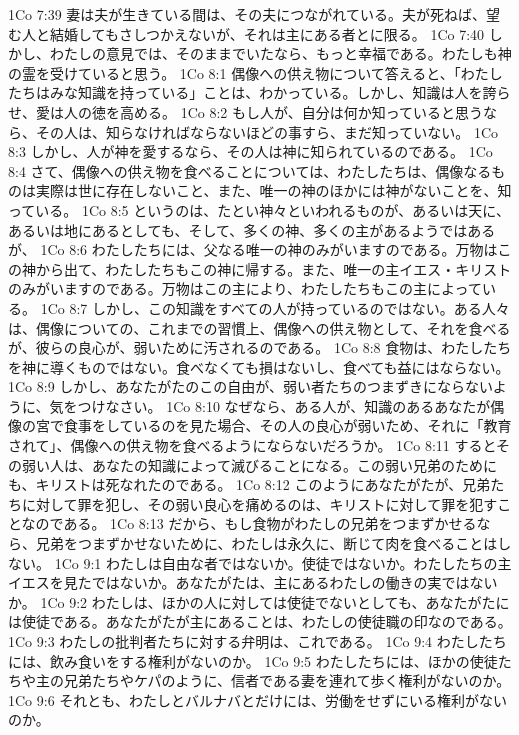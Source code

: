 1Co 7:39  妻は夫が生きている間は、その夫につながれている。夫が死ねば、望む人と結婚してもさしつかえないが、それは主にある者とに限る。
1Co 7:40  しかし、わたしの意見では、そのままでいたなら、もっと幸福である。わたしも神の霊を受けていると思う。
1Co 8:1  偶像への供え物について答えると、「わたしたちはみな知識を持っている」ことは、わかっている。しかし、知識は人を誇らせ、愛は人の徳を高める。
1Co 8:2  もし人が、自分は何か知っていると思うなら、その人は、知らなければならないほどの事すら、まだ知っていない。
1Co 8:3  しかし、人が神を愛するなら、その人は神に知られているのである。
1Co 8:4  さて、偶像への供え物を食べることについては、わたしたちは、偶像なるものは実際は世に存在しないこと、また、唯一の神のほかには神がないことを、知っている。
1Co 8:5  というのは、たとい神々といわれるものが、あるいは天に、あるいは地にあるとしても、そして、多くの神、多くの主があるようではあるが、
1Co 8:6  わたしたちには、父なる唯一の神のみがいますのである。万物はこの神から出て、わたしたちもこの神に帰する。また、唯一の主イエス・キリストのみがいますのである。万物はこの主により、わたしたちもこの主によっている。
1Co 8:7  しかし、この知識をすべての人が持っているのではない。ある人々は、偶像についての、これまでの習慣上、偶像への供え物として、それを食べるが、彼らの良心が、弱いために汚されるのである。
1Co 8:8  食物は、わたしたちを神に導くものではない。食べなくても損はないし、食べても益にはならない。
1Co 8:9  しかし、あなたがたのこの自由が、弱い者たちのつまずきにならないように、気をつけなさい。
1Co 8:10  なぜなら、ある人が、知識のあるあなたが偶像の宮で食事をしているのを見た場合、その人の良心が弱いため、それに「教育されて」、偶像への供え物を食べるようにならないだろうか。
1Co 8:11  するとその弱い人は、あなたの知識によって滅びることになる。この弱い兄弟のためにも、キリストは死なれたのである。
1Co 8:12  このようにあなたがたが、兄弟たちに対して罪を犯し、その弱い良心を痛めるのは、キリストに対して罪を犯すことなのである。
1Co 8:13  だから、もし食物がわたしの兄弟をつまずかせるなら、兄弟をつまずかせないために、わたしは永久に、断じて肉を食べることはしない。
1Co 9:1  わたしは自由な者ではないか。使徒ではないか。わたしたちの主イエスを見たではないか。あなたがたは、主にあるわたしの働きの実ではないか。
1Co 9:2  わたしは、ほかの人に対しては使徒でないとしても、あなたがたには使徒である。あなたがたが主にあることは、わたしの使徒職の印なのである。
1Co 9:3  わたしの批判者たちに対する弁明は、これである。
1Co 9:4  わたしたちには、飲み食いをする権利がないのか。
1Co 9:5  わたしたちには、ほかの使徒たちや主の兄弟たちやケパのように、信者である妻を連れて歩く権利がないのか。
1Co 9:6  それとも、わたしとバルナバとだけには、労働をせずにいる権利がないのか。
